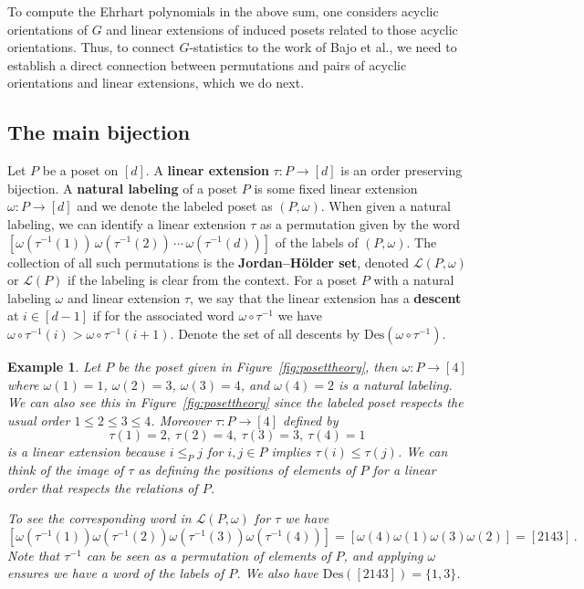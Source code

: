 \documentclass[11pt]{amsart}
\newtheorem{exam}{Example}
\newenvironment{example}{\begin{exam}\sf}{\end{exam}}
\newcommand\Def[1]{{\bf #1}}
\newcommand{\des}{\mathrm{Des}}
\newcommand{\jhset}[1]{\mathcal{L}(#1)}
\begin{document}
To compute the Ehrhart polynomials in the above sum, one considers acyclic orientations of $G$ and linear extensions of induced posets related to those acyclic orientations. 
Thus, to connect $G$-statistics to the work of Bajo et al., we need to establish a direct connection between permutations and pairs of acyclic orientations and linear extensions, which we do next.

\subsection{The main bijection}


Let $P$ be a poset on $[d]$. A \Def{linear extension} $\tau:P \to [d]$ is an order preserving bijection. 
A \Def{natural labeling} of a poset $P$ is some fixed linear extension $\omega:P \to [d]$ and we denote the labeled poset as $(P,\omega)$.
When given a natural labeling, we can identify a linear extension $\tau$ as a permutation given by the word $[\omega(\tau^{-1}(1))\,  \omega(\tau^{-1}(2)) \, \cdots \, \omega(\tau^{-1}(d))]$ of the labels of $(P,\omega)$. 
The collection of all such permutations is the \Def{Jordan--H\"older set}, denoted $\jhset{P,\omega}$ or
$\jhset{P}$ if the labeling is clear from the context.
For a poset $P$ with a natural labeling $\omega$ and linear extension $\tau$, we say that the linear extension has a \Def{descent} at $i \in [d-1]$ if for the associated word $\omega \circ \tau^{-1}$ we have $\omega \circ \tau^{-1}(i) > \omega \circ \tau^{-1} (i+1)$.
Denote the set of all descents by $\des(\omega \circ \tau^{-1})$.

\begin{example}\label{ex:posettheory}
    Let $P$ be the poset given in Figure~\ref{fig:posettheory}, then $\omega:P \to [4]$ where $\omega(1)=1$, $\omega(2)=3$, $\omega(3)=4$, and $\omega(4)=2$ is a natural labeling.
    We can also see this in Figure~\ref{fig:posettheory} since the labeled poset respects the usual order $1 \leq 2 \leq 3 \leq 4$.
    Moreover $\tau:P \to [4]$ defined by
    \[
        \tau(1) = 2, \ \tau(2)=4, \ \tau(3)=3, \ \tau(4)=1
    \]
    is a linear extension because $i \leq_P j$ for $i,j \in P$ implies $\tau(i) \leq \tau(j)$. We can think of the image of $\tau$ as defining the positions of elements of $P$ for a linear order that respects the relations of $P$.

    To see the corresponding word in $\jhset{P,\omega}$ for $\tau$ we have
    \[
        [\omega(\tau^{-1}(1))\omega(\tau^{-1}(2))\omega(\tau^{-1}(3))\omega(\tau^{-1}(4))] = [\omega(4)
\omega(1) \omega(3) \omega(2)] = [2143] \, .
    \]
    Note that $\tau^{-1}$ can be seen as a permutation of elements of $P$, and applying $\omega$ ensures we have a word of the labels of $P$.
    We also have $\des([2143])=\{1,3\}$.
\end{example}
\end{document}
